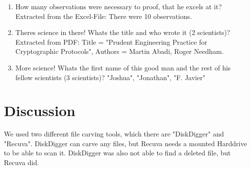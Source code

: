 \documentclass{scrreprt}
\begin{document}
\begin{enumerate}
\item How many observations were necessary to proof, that he excels at it? Extracted from the Excel-File: There were 10 observations.
\item Theres science in there! Whats the title and who wrote it (2 scientists)? Extracted from PDF: Title = "Prudent Engineering Practice for Cryptographic Protocols", Authors = Martin Abadi, Roger Needham.
\item More science! Whats the first name of this good man and the rest of his fellow scientists
(3 scientists)? "Joshua", "Jonathan", "F. Javier"
\end{enumerate}

\section{Discussion}
We used two different file carving tools, which there are "DiskDigger" and "Recuva". DiskDigger can carve any files, but Recuva needs a mounted Harddrive to be able to scan it. DiskDigger was also not able to find a deleted file, but Recuva did.
\end{document}
